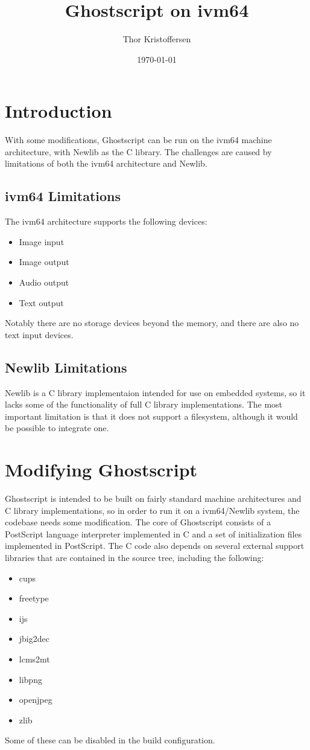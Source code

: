 \documentclass[a4paper,11pt]{article}
\author{Thor Kristoffersen}
\date{\today}
\title{Ghostscript on ivm64}
\begin{document}
\maketitle

\section{Introduction}
\label{sec:introduction}

With some modifications, Ghostscript can be run on the ivm64 machine architecture, with Newlib as the C library.
The challenges are caused by limitations of both the ivm64 architecture and Newlib.

\subsection{ivm64 Limitations}

The ivm64 architecture supports the following devices:
\begin{itemize}
\item Image input
\item Image output
\item Audio output
\item Text output
\end{itemize}
Notably there are no storage devices beyond the memory, and there are also no text input devices.

\subsection{Newlib Limitations}

Newlib is a C library implementaion intended for use on embedded systems, so it lacks some of the functionality of full C library implementations.
The most important limitation is that it does not support a filesystem, although it would be possible to integrate one.

\section{Modifying Ghostscript}
\label{sec:modifying-ghostview}

Ghostscript is intended to be built on fairly standard machine architectures and C library implementations, so in order to run it on a ivm64/Newlib system, the codebase needs some modification.
The core of Ghostscript consists of a PostScript language interpreter implemented in C and a set of initialization files implemented in PostScript.
The C code also depends on several external support libraries that are contained in the source tree, including the following:
\begin{itemize}
\item cups
\item freetype
\item ijs
\item jbig2dec
\item lcms2mt
\item libpng
\item openjpeg
\item zlib
\end{itemize}
Some of these can be disabled in the build configuration.
\end{document}
